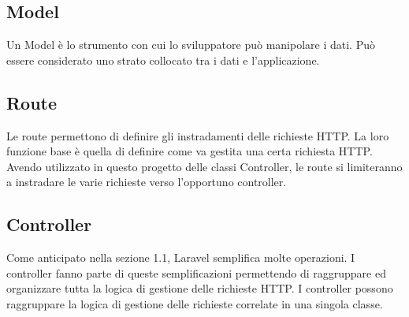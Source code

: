 \subsection{Model}
Un Model \citep{rif16}è lo strumento con cui lo sviluppatore può manipolare i dati. Può essere considerato uno strato collocato tra i dati e l'applicazione.

\subsection{Route}
Le route \citep{rif15}permettono di definire gli instradamenti delle richieste HTTP. La loro funzione base è quella di definire come va gestita una certa richiesta HTTP. Avendo utilizzato in questo progetto delle classi Controller, le route si limiteranno a instradare le varie richieste verso l'opportuno controller.

\subsection{Controller}
Come anticipato nella sezione 1.1, Laravel semplifica molte operazioni. I controller \citep{rif14} fanno parte di queste semplificazioni permettendo di raggruppare ed organizzare tutta la logica di gestione delle richieste HTTP. I controller possono raggruppare la logica di gestione delle richieste correlate in una singola classe.

